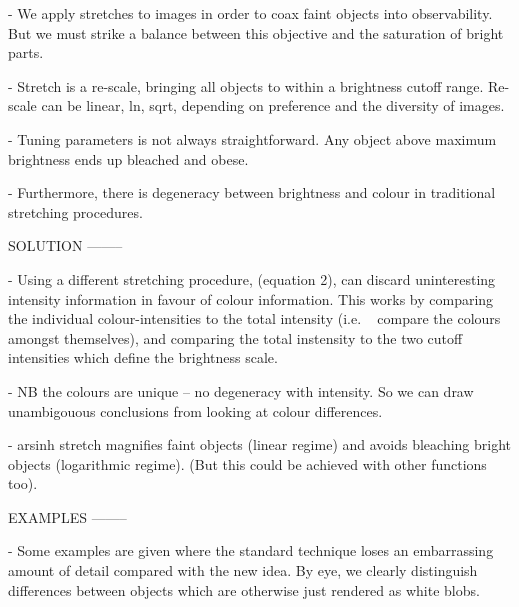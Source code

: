 \documentclass[letterpaper, 11pt]{article}
\begin{document}
- We apply stretches to images in order to coax faint objects into observability. But we must strike a balance between this objective and the saturation of bright parts.

- Stretch is a re-scale, bringing all objects to within a brightness cutoff range. Re-scale can be linear, ln, sqrt, depending on preference and the diversity of images.

- Tuning parameters is not always straightforward. Any object above maximum brightness ends up bleached and obese.

- Furthermore, there is degeneracy between brightness and colour in traditional stretching procedures.


SOLUTION
--------

- Using a different stretching procedure, (equation 2), can discard uninteresting intensity information in favour of colour information. This works by comparing the individual colour-intensities to the total intensity (i.e. ~ compare the colours amongst themselves), and comparing the total instensity to the two cutoff intensities which define the brightness scale.

- NB the colours are unique -- no degeneracy with intensity. So we can draw unambigouous conclusions from looking at colour differences.

- arsinh stretch magnifies faint objects (linear regime) and avoids bleaching bright objects (logarithmic regime). (But this could be achieved with other functions too).


EXAMPLES
--------

- Some examples are given where the standard technique loses an embarrassing amount of detail compared with the new idea. By eye, we clearly distinguish differences between objects which are otherwise just rendered as white blobs.


\newpage
{}


\end{document}

